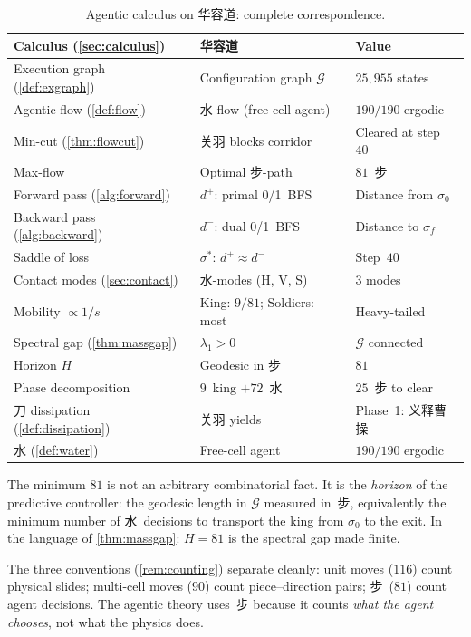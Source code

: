 \begin{table}[H]
\centering\small
\caption{Agentic calculus on 华容道: complete correspondence.}%
\label{tab:kpc}
\begin{tabular}{@{}lll@{}}
\toprule
\textbf{Calculus (\cref{sec:calculus})} &
\textbf{华容道} &
\textbf{Value} \\
\midrule
Execution graph (\cref{def:exgraph}) &
  Configuration graph $\mathcal{G}$ &
  $25{,}955$ states \\
Agentic flow (\cref{def:flow}) &
  水-flow (free-cell agent) &
  $190/190$ ergodic \\
Min-cut (\cref{thm:flowcut}) &
  关羽 blocks corridor &
  Cleared at step~$40$ \\
Max-flow &
  Optimal 步-path &
  $81$~步 \\
Forward pass (\cref{alg:forward}) &
  $d^+$: primal 0/1~BFS &
  Distance from $\sigma_0$ \\
Backward pass (\cref{alg:backward}) &
  $d^-$: dual 0/1~BFS &
  Distance to $\sigma_f$ \\
Saddle of loss &
  $\sigma^*$: $d^+ \approx d^-$ &
  Step~$40$ \\
Contact modes (\cref{sec:contact}) &
  水-modes (H, V, S) &
  $3$ modes \\
Mobility $\propto 1/s$ &
  King: $9/81$; Soldiers: most &
  Heavy-tailed \\
Spectral gap (\cref{thm:massgap}) &
  $\lambda_1 > 0$ &
  $\mathcal{G}$ connected \\
Horizon $H$ &
  Geodesic in 步 &
  $81$ \\
Phase decomposition &
  $9$~king $+ 72$~水 &
  $25$~步 to clear \\
刀 dissipation (\cref{def:dissipation}) &
  关羽 yields &
  Phase~1: 义释曹操 \\
水 (\cref{def:water}) &
  Free-cell agent &
  $190/190$ ergodic \\
\bottomrule
\end{tabular}
\end{table}

\begin{remark}[$81$ as horizon]\label{rem:eightyone}
The minimum $81$ is not an arbitrary combinatorial fact.
It is the \emph{horizon} of the predictive controller:
the geodesic length in $\mathcal{G}$ measured in~步,
equivalently the minimum number of
\textcolor{water}{水}~decisions to transport the king from
$\sigma_0$ to the exit.
In the language of \cref{thm:massgap}:
$H = 81$ is the spectral gap made finite.

The three conventions (\cref{rem:counting}) separate
cleanly: unit moves ($116$) count physical slides;
multi-cell moves ($90$) count piece--direction pairs;
步~($81$) count agent decisions.
The agentic theory uses~步 because it counts
\emph{what the agent chooses}, not what the physics does.
\end{remark}
